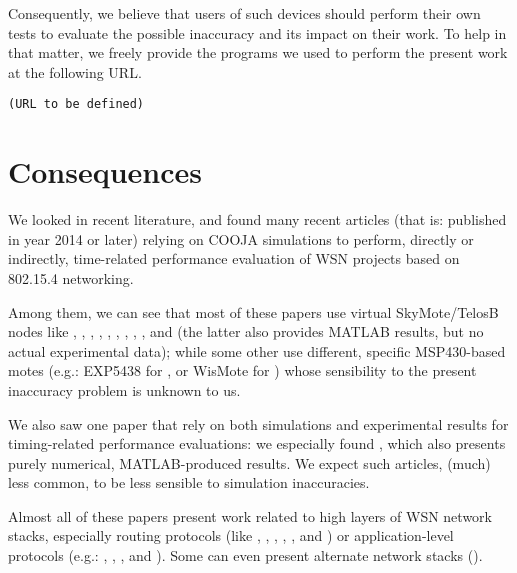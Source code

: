 \documentclass[10pt,final,journal,twocolumn]{IEEEtran}
\begin{document}
Consequently, we believe that users of such devices should perform their
own tests to evaluate the possible inaccuracy and its impact on their work.
To help in that matter, we freely provide the programs we used to perform the
present work at the following URL.

\begin{center}
\texttt{(URL to be defined)}
\end{center}



\section{Consequences}
\label{consequences}

We looked in recent literature, and found many recent articles (that is:
published in year 2014 or later) relying on COOJA simulations to perform,
directly or indirectly, time-related performance evaluation of WSN projects
based on 802.15.4 networking.

Among them, we can see that most of these papers use virtual SkyMote/TelosB
nodes like
\cite{Constrain-Routing-Trees-2014}, \cite{Contiki-RPL-Eval-2014},
\cite{Co-RPL-2014}, \cite{DINAS-2014},
\cite{Efficient-Distrib-Svc-Discovery-2014},
\cite{IETF-Routing-WSN-2014},
\cite{TinySDN-2014}, \cite{Trickle-L2-2014},
\cite{Visual-Sensor-Networks-2014},
and \cite{RPL-GreenHouse-Convgc-Time-2014} (the latter also provides
MATLAB results, but no actual experimental data);
while some other use different, specific MSP430-based motes
(e.g.: EXP5438 for \cite{Key-Mgmt-2015}, or WisMote for
\cite{Lightweight-Multicast-Forwarding-2014}) whose sensibility
to the present inaccuracy problem is unknown to us.

We also saw one paper that rely on both simulations and experimental
results for timing-related performance evaluations: we especially found
\cite{Probing-Mech-wu-2015}, which also presents purely numerical,
MATLAB-produced results. We expect such articles, (much) less common,
to be less sensible to simulation inaccuracies.

Almost all of these papers present work related to high layers of
WSN network stacks, especially routing protocols (like
\cite{Constrain-Routing-Trees-2014}, \cite{Contiki-RPL-Eval-2014},
\cite{Co-RPL-2014}, \cite{IETF-Routing-WSN-2014},
\cite{Trickle-L2-2014}, and \cite{RPL-GreenHouse-Convgc-Time-2014})
or application-level protocols (e.g.: \cite{DINAS-2014},
\cite{Efficient-Distrib-Svc-Discovery-2014},
\cite{Visual-Sensor-Networks-2014}, and \cite{Key-Mgmt-2015}).
Some can even present alternate network stacks (\cite{TinySDN-2014}).
\end{document}
